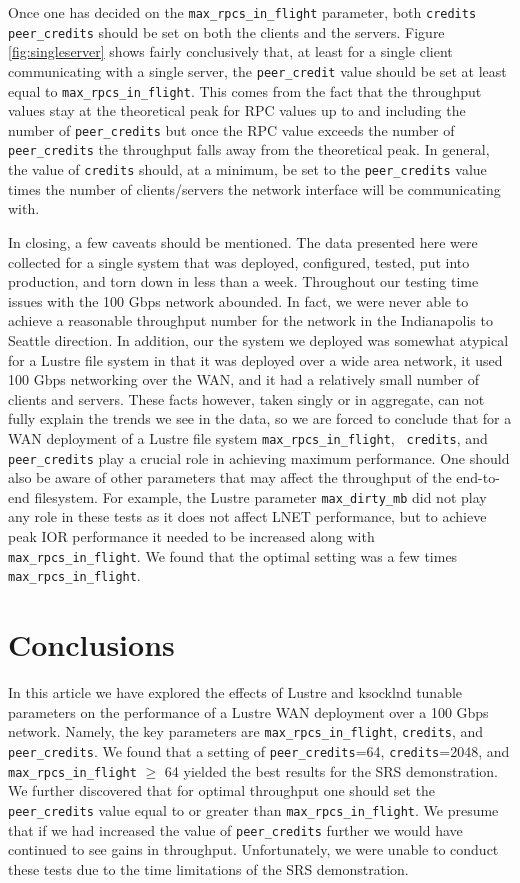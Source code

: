 \documentclass[]{sigplan-proc}
\begin{document}
Once one has decided on the {\tt max\_rpcs\_in\_flight} parameter, both {\tt credits} {\tt peer\_credits}
should be set on both the clients and the servers. Figure \ref{fig:singleserver} shows fairly conclusively
that, at least for a single client communicating with a single server, the {\tt peer\_credit} value should be
set at least equal to {\tt max\_rpcs\_in\_flight}. This comes from the fact that the throughput values stay at
the theoretical peak for RPC values up to and including the number of {\tt peer\_credits} but once the RPC
value exceeds the number of {\tt peer\_credits} the throughput falls away from the theoretical peak. In
general, the value of {\tt credits} should, at a minimum, be set to the {\tt peer\_credits} value times the number of
clients/servers the network interface will be communicating with.

In closing, a few caveats should be mentioned. The data presented here were collected for a single system that
was deployed, configured, tested, put into production, and torn down in less than a week. Throughout our
testing time issues with the 100 Gbps network abounded. In fact, we were never able to achieve a reasonable
throughput number for the network in the Indianapolis to Seattle direction. In addition, our the system we
deployed was somewhat atypical for a Lustre file system in that it was deployed over a wide area network, it
used 100 Gbps networking over the WAN, and it had a relatively small number of clients and servers. These
facts however, taken singly or in aggregate, can not fully explain the trends we see in the data, so we are
forced to conclude that for a WAN deployment of a Lustre file system {\tt max\_rpcs\_in\_flight}, {\tt
  credits}, and {\tt peer\_credits} play a crucial role in achieving maximum performance. One should also be
aware of other parameters that may affect the throughput of the end-to-end filesystem. For example, the Lustre
parameter {\tt max\_dirty\_mb} did not play any role in these tests as it does not affect LNET performance,
but to achieve peak IOR performance it needed to be increased along with {\tt max\_rpcs\_in\_flight}. We found
that the optimal setting was a few times {\tt max\_rpcs\_in\_flight}.

\section{Conclusions}\label{sec:conclusion}

In this article we have explored the effects of Lustre and ksocklnd tunable parameters on the performance of a
Lustre WAN deployment over a 100 Gbps network. Namely, the key parameters are {\tt max\_rpcs\_in\_flight},
{\tt credits}, and {\tt peer\_credits}. We found that a setting of {\tt peer\_credits}=64, {\tt credits}=2048,
and {\tt max\_rpcs\_in\_flight} $\geq$ 64 yielded the best results for the SRS demonstration. We further
discovered that for optimal throughput one should set the {\tt peer\_credits} value equal to or greater than
{\tt max\_rpcs\_in\_flight}. We presume that if we had increased the value of {\tt peer\_credits} further we
would have continued to see gains in throughput. Unfortunately, we were unable to conduct these tests due to
the time limitations of the SRS demonstration.
\end{document}
